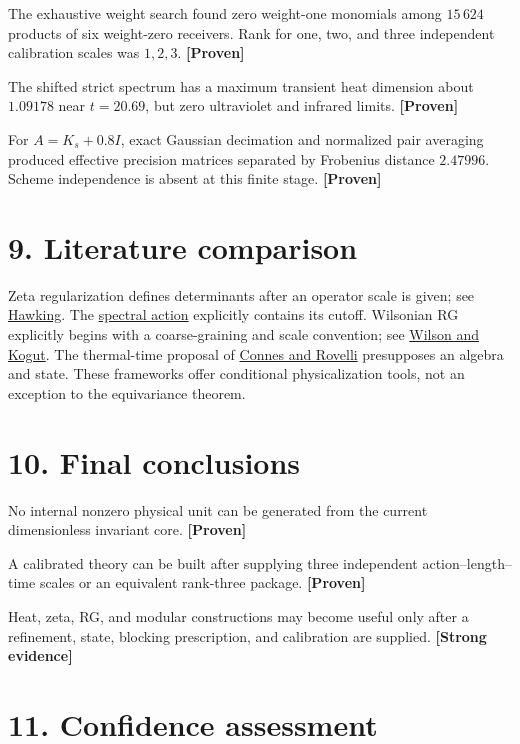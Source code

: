 \documentclass[11pt,a4paper,openany]{report}
\newcommand{\statusProven}{\textcolor{fingreen}{[Proven]}}
\newcommand{\statusStrong}{\textcolor{finblue}{[Strong evidence]}}
\begin{document}
The exhaustive weight search found zero weight-one monomials among \(15\,624\) products of six weight-zero receivers. Rank for one, two, and three independent calibration scales was \(1,2,3\). \textbf{\statusProven{}}

The shifted strict spectrum has a maximum transient heat dimension about \(1.09178\) near \(t=20.69\), but zero ultraviolet and infrared limits. \textbf{\statusProven{}}

For \(A=K_s+0.8I\), exact Gaussian decimation and normalized pair averaging produced effective precision matrices separated by Frobenius distance \(2.47996\). Scheme independence is absent at this finite stage. \textbf{\statusProven{}}

\section{9. Literature comparison}

Zeta regularization defines determinants after an operator scale is given; see \href{https://doi.org/10.1007/BF01626516}{Hawking}. The \href{https://arxiv.org/abs/hep-th/9606001}{spectral action} explicitly contains its cutoff. Wilsonian RG explicitly begins with a coarse-graining and scale convention; see \href{https://doi.org/10.1016/0370-1573(74)90023-4}{Wilson and Kogut}. The thermal-time proposal of \href{https://arxiv.org/abs/gr-qc/9406019}{Connes and Rovelli} presupposes an algebra and state. These frameworks offer conditional physicalization tools, not an exception to the equivariance theorem.

\section{10. Final conclusions}

No internal nonzero physical unit can be generated from the current dimensionless invariant core. \textbf{\statusProven{}}

A calibrated theory can be built after supplying three independent action–length–time scales or an equivalent rank-three package. \textbf{\statusProven{}}

Heat, zeta, RG, and modular constructions may become useful only after a refinement, state, blocking prescription, and calibration are supplied. \textbf{\statusStrong{}}

\section{11. Confidence assessment}
\end{document}
